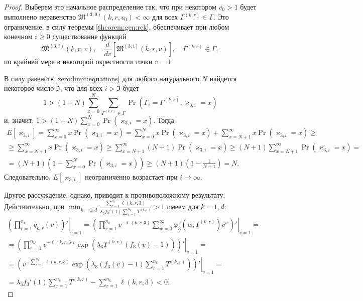 \begin{proof}
Выберем это начальное распределение так,  что при некотором $v_0 >1$  будет выполнено неравенство $\mathfrak{M}^{(3, 0)}(k, r, v_0) <\infty$ для всех $\Gamma^{(k, r)}\in \Gamma$. Это ограничение,  в силу теоремы \eqref{theorem:gen:rek},  обеспечивает при любом конечном $i\geqslant 0$ существование функций 
\begin{equation}
\mathfrak{M}^{(3, i)}(k, r, v), \quad \frac{d}{dv} \left[\mathfrak{M}^{(3, i)}(k, r, v)\right],  \quad \Gamma^{(k, r)} \in \Gamma, 
\end{equation}
по крайней мере в некоторой окрестности точки $v=1$.

В силу равенств \eqref{zero:limit:equations} для любого натурального $N$ найдется некоторое число $\mathfrak{I}$,  что для всех $i > \mathfrak{I}$ будет
$$
1 > (1+N) \sum_{x=0}^{N} \sum_{\Gamma^{(k, r)}\in \Gamma}  \Pr(\Gamma_{i}=\Gamma^{(k, r)},  \varkappa_{3, i}=x)
$$ и,  значит,  $1 > (1+N) \sum_{x=0}^{N}  \Pr(\varkappa_{3, i}=x)$. Тогда
\begin{multline*}
E[\varkappa_{3, i}] = \sum_{x=0}^{\infty} x \Pr(\varkappa_{3, i}=x) = \sum_{x=0}^{N} x \Pr(\varkappa_{3, i}=x) + \sum_{x=N+1}^{\infty} x \Pr(\varkappa_{3, i}=x) \geqslant \\ \geqslant  \sum_{x=N+1}^{\infty} x \Pr(\varkappa_{3, i}=x) \geqslant \sum_{x=N+1}^{\infty} (N+1)
\Pr(\varkappa_{3, i}=x) \geqslant (N+1) \sum_{x=N+1}^{\infty} \Pr( \varkappa_{3, i}=x) =\\ =  (N+1) \left(1 - \sum_{x=0}^{N} \Pr(\varkappa_{3, i}=x)\right) \geqslant (N+1) \left(1 - \frac{1}{N+1}\right) = N.
\end{multline*}
Следовательно,  $E[\varkappa_{3, i}]$ неограниченно возрастает при $i \to \infty$. 

Другое рассуждение,  однако,  приводит к противоположному результату. Действительно,  при $\min_{k=\overline{1, d}} { \frac{\sum_{r = 1}^{n_k} \ell(k, r, 3) }{\lambda_3 f_3'(1) \sum_{r=1}^{n_k} T^{(k, r)} }}>1$ имеем для $k=\overline{1, d}$:
\begin{multline}
 \left.\left(\prod_{r=1}^{n_k}q_{k, r}(v)\right) ' \right|_{v=1} = 
  \left.\left(\prod_{r=1}^{n_k}v^{-\ell(k, r, 3)}\sum_{w=0}^{\infty} \varphi_3(w, T^{(k, r)})v^w \right) ' \right|_{v=1} = \\ =
   \left.\left(\prod_{r=1}^{n_k} v^{-\ell(k, r, 3)}\exp(\lambda_3 T^{(k, r)} (f_3(v)-1))\right) ' \right|_{v=1} = \\ =
    \left.\left(v^{-\sum_{r=1}^{n_k}\ell(k, r, 3)}\exp(\lambda_3 (f_3(v)-1)\sum_{r=1}^{n_k} T^{(k, r)}) \right) ' \right|_{v=1} = \\ =
\lambda_3 f_3'(1) \sum_{r=1}^{n_k} T^{(k, r)} -\sum_{r=1}^{n_k} \ell(k, r, 3)  < 0.
\label{derivative:cycle}
\end{multline}


\end{proof}
